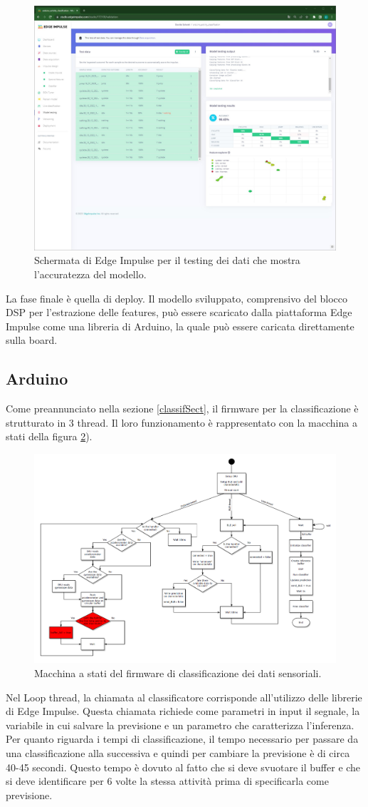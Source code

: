 \begin{figure}[h!]
	\centering
	\includegraphics[width=0.5\linewidth]{./ImageFiles/model_test.jpg}
	\caption{Schermata di Edge Impulse per il testing dei dati che mostra l'accuratezza del modello.}
	\label{fig:model_test}
\end{figure}

La fase finale è quella di deploy. Il modello sviluppato, comprensivo del blocco DSP per l'estrazione delle features, può essere scaricato dalla piattaforma Edge Impulse come una libreria di Arduino, la quale può essere caricata direttamente sulla board. 


\subsection{Arduino} \label{arduinoSect}
Come preannunciato nella sezione \ref{classifSect}, il firmware per la classificazione è strutturato in 3 thread. Il loro funzionamento è rappresentato con la macchina a stati della figura \ref{fig:SM_classif}).
\begin{figure}[tbh]
	\centering
	\includegraphics[width=0.8\linewidth]{./ImageFiles/SM_classification}
	\caption{Macchina a stati del firmware di classificazione dei dati sensoriali.}
	\label{fig:SM_classif}
\end{figure}
Nel Loop thread, la chiamata al classificatore corrisponde all'utilizzo delle librerie di Edge Impulse. Questa chiamata richiede come parametri in input il segnale, la variabile in cui salvare la previsione e un parametro che caratterizza l'inferenza.
Per quanto riguarda i tempi di classificazione, il tempo necessario per passare da una classificazione alla successiva e quindi per cambiare la previsione è di circa 40-45 secondi. Questo tempo è dovuto al fatto che si deve svuotare il buffer e che si deve identificare per 6 volte la stessa attività prima di specificarla come previsione.